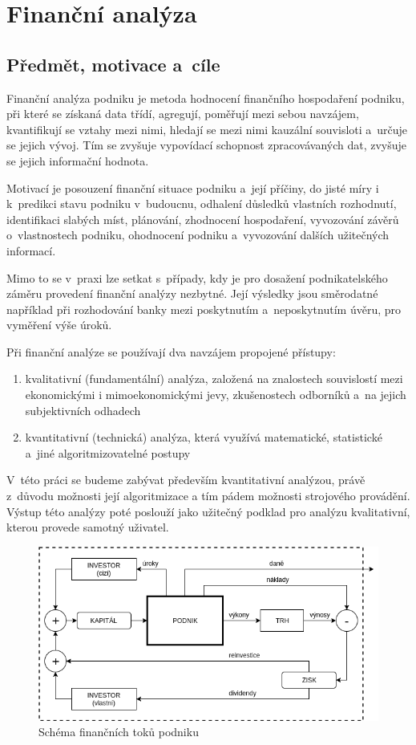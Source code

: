 \chapter{Finanční analýza}


\section{Předmět, motivace a~cíle}
Finanční analýza podniku je metoda hodnocení finančního hospodaření podniku, při které se získaná data třídí, agregují, poměřují mezi sebou navzájem, kvantifikují se vztahy mezi nimi, hledají se mezi nimi kauzální souvisloti a~určuje se jejich vývoj. Tím se zvyšuje vypovídací schopnost zpracovávaných dat, zvyšuje se jejich informační hodnota.\cite{sedl}

Motivací je posouzení finanční situace podniku a~její příčiny, do jisté míry i k~predikci stavu podniku v~budoucnu, odhalení důsledků vlastních rozhodnutí, identifikaci slabých míst, plánování, zhodnocení hospodaření, vyvozování závěrů o~vlastnostech podniku, ohodnocení podniku a~vyvozování dalších užitečných informací.

Mimo to se v~praxi lze setkat s~případy, kdy je pro dosažení podnikatelského záměru provedení finanční analýzy nezbytné. Její výsledky jsou směrodatné například při rozhodování banky mezi poskytnutím a~neposkytnutím úvěru, pro vyměření výše úroků.

Při finanční analýze se používají dva navzájem propojené přístupy\cite{kova}:
\begin{enumerate}
	\item kvalitativní (fundamentální) analýza, založená na znalostech souvislostí mezi ekonomickými i mimoekonomickými jevy, zkušenostech odborníků a~na jejich subjektivních odhadech
	\item kvantitativní (technická) analýza, která využívá matematické, statistické a~jiné algoritmizovatelné postupy
\end{enumerate}

V~této práci se budeme zabývat především kvantitativní analýzou, právě z~důvodu možnosti její algoritmizace a tím pádem možnosti strojového provádění. Výstup této analýzy poté poslouží jako užitečný podklad pro analýzu kvalitativní, kterou provede samotný uživatel.


\begin{figure}
  \centering
  \includegraphics[width=14cm]{img/ccf.png}
  \caption{Schéma finančních toků podniku \cite{sedl}}
  \label{ccf}
\end{figure}

